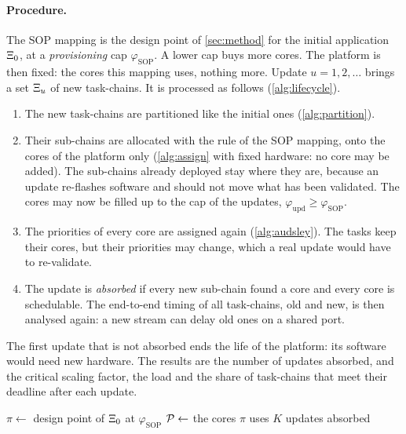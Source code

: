 \paragraph{Procedure.} The SOP mapping is the design point of
\cref{sec:method} for the initial application $\Xi_0$, at a
\emph{provisioning} cap $\varphi_{\mathrm{SOP}}$. A lower cap buys more
cores. The platform is then fixed: the cores this mapping uses, nothing
more. Update $u=1,2,\dots$ brings a set $\Xi_u$ of new task-chains. It
is processed as follows (\cref{alg:lifecycle}).
\begin{enumerate}
\item The new task-chains are partitioned like the initial ones
(\cref{alg:partition}).
\item Their sub-chains are allocated with the rule of the SOP mapping, onto
the cores of the platform only (\cref{alg:assign} with fixed hardware: no
core may be added). The sub-chains already deployed stay where they are,
because an update re-flashes software and should not move what has been
validated. The cores may now be filled up to the cap of the updates,
$\varphi_{\mathrm{upd}}\ge\varphi_{\mathrm{SOP}}$.
\item The priorities of every core are assigned again
(\cref{alg:audsley}). The tasks keep their cores, but their priorities may
change, which a real update would have to re-validate.
\item The update is \emph{absorbed} if every new sub-chain found a core and
every core is schedulable. The end-to-end timing of all task-chains, old
and new, is then analysed again: a new stream can delay old ones on a
shared port.
\end{enumerate}
The first update that is not absorbed ends the life of the platform: its
software would need new hardware. The results are the number of updates
absorbed, and the critical scaling factor, the load and the share of
task-chains that meet their deadline after each update.

\begin{algorithm2e}[t]
\caption{\textsf{Lifecycle}$(\Chains_0,\Chains_1,\dots,\Chains_K)$}
\label{alg:lifecycle}
$\pi\gets$ design point of $\Xi_0$ at $\varphi_{\mathrm{SOP}}$\;
$\mathcal{P}\gets$ the cores $\pi$ uses 
\Return $K$ updates absorbed\;
\end{algorithm2e}


